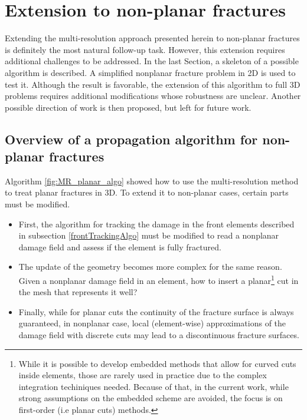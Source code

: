 \section{Extension to non-planar fractures}
\label{section: Chapter4/nonplanar}

Extending the multi-resolution approach presented herein to non-planar fractures is definitely the most natural follow-up task. However, this extension requires additional challenges to be addressed. In the last Section, a skeleton of a possible algorithm is described. A simplified nonplanar fracture problem in 2D is used to test it. Although the result is favorable, the extension of this algorithm to full 3D problems requires additional modifications whose robustness are unclear. Another possible direction of work is then proposed, but left for future work.

\subsection{Overview of a propagation algorithm for non-planar fractures}\label{basicNonplanarAlgo}

Algorithm \ref{fig:MR_planar_algo} showed how to use the multi-resolution method to treat planar fractures in 3D. To extend it to non-planar cases, certain parts must be modified. 

\begin{itemize}
    \item First, the algorithm for tracking the damage in the front elements described in subsection \ref{frontTrackingAlgo} must be modified to read a nonplanar damage field and assess if the element is fully fractured. 
    
    \item The update of the geometry becomes more complex for the same reason. Given a nonplanar damage field in an element, how to insert a planar\footnote{While it is possible to develop embedded methods that allow for curved cuts inside elements, those are rarely used in practice due to the complex integration techiniques needed. Because of that, in the current work, while strong assumptions on the embedded scheme are avoided, the focus is on first-order (i.e planar cuts) methods.} cut in the mesh that represents it well?
    
    \item Finally, while for planar cuts the continuity of the fracture surface is always guaranteed, in nonplanar case, local (element-wise) approximations of the damage field with discrete cuts may lead to a discontinuous fracture surfaces.
\end{itemize}

